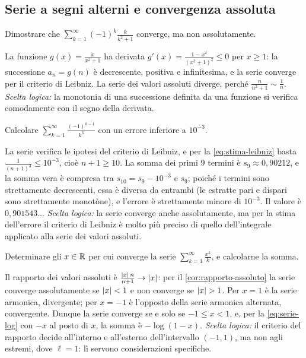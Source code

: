 \subsection*{Serie a segni alterni e convergenza assoluta}

\begin{esercizio}
Dimostrare che $\sum_{k=1}^{\infty}(-1)^{k}\frac k{k^{2}+1}$ converge, ma non assolutamente.
\begin{soluzione}
La funzione $g(x)=\frac x{x^{2}+1}$ ha derivata $g'(x)=\frac{1-x^{2}}{(x^{2}+1)^{2}}\le0$ per $x\ge1$: la
successione $a_{n}=g(n)$ è decrescente, positiva e infinitesima, e la serie converge per il
criterio di Leibniz. La serie dei valori assoluti diverge, perché $\frac n{n^{2}+1}\sim\frac1n$.
\emph{Scelta logica:} la monotonia di una successione definita da una funzione si
verifica comodamente con il segno della derivata.
\end{soluzione}
\end{esercizio}

\begin{esercizio}
Calcolare $\sum_{k=1}^{\infty}\frac{(-1)^{k-1}}{k^{3}}$ con un errore inferiore a $10^{-3}$.
\begin{soluzione}
La serie verifica le ipotesi del criterio di Leibniz, e per la \eqref{eq:stima-leibniz}
basta $\frac1{(n+1)^{3}}\le10^{-3}$, cioè $n+1\ge10$. La somma dei primi $9$ termini è
$s_{9}\approx0{,}90212$, e la somma vera è compresa tra $s_{10}=s_{9}-10^{-3}$ e $s_{9}$; poiché i termini sono
strettamente decrescenti, essa è diversa da entrambi (le estratte pari e dispari sono
strettamente monotòne), e l'errore è strettamente minore di $10^{-3}$. Il valore è
$0{,}901543\ldots$ \emph{Scelta logica:} la serie converge anche assolutamente, ma per la
stima dell'errore il criterio di Leibniz è molto più preciso di quello dell'integrale
applicato alla serie dei valori assoluti.
\end{soluzione}
\end{esercizio}

\begin{esercizio}\label{es:serie-xk-su-k}
Determinare gli $x\in\mathbb{R}$ per cui converge la serie $\sum_{k=1}^{\infty}\frac{x^{k}}k$, e calcolarne la
somma.
\begin{soluzione}
Il rapporto dei valori assoluti è $\frac{\lvert x\rvert\,n}{n+1}\to\lvert x\rvert$: per il \cref{cor:rapporto-assoluto}
la serie converge assolutamente se $\lvert x\rvert<1$ e non converge se $\lvert x\rvert>1$. Per $x=1$ è la
serie armonica, divergente; per $x=-1$ è l'opposto della serie armonica alternata,
convergente. Dunque la serie converge se e solo se $-1\le x<1$, e, per la \eqref{eq:serie-log}
con $-x$ al posto di $x$, la somma è $-\log(1-x)$. \emph{Scelta logica:} il criterio del
rapporto decide all'interno e all'esterno dell'intervallo $(-1,1)$, ma non agli estremi,
dove $\ell=1$: lì servono considerazioni specifiche.
\end{soluzione}
\end{esercizio}

